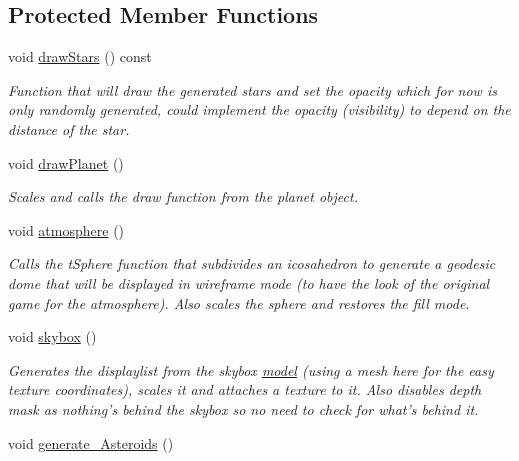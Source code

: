 \subsection*{Protected Member Functions}
\begin{DoxyCompactItemize}
\item 
\hypertarget{classWorld_afe713d51edb875a7b610998fa85d18c3}{
void \hyperlink{classWorld_afe713d51edb875a7b610998fa85d18c3}{drawStars} () const }
\label{classWorld_afe713d51edb875a7b610998fa85d18c3}

\begin{DoxyCompactList}\small\item\em Function that will draw the generated stars and set the opacity which for now is only randomly generated, could implement the opacity (visibility) to depend on the distance of the star. \item\end{DoxyCompactList}\item 
\hypertarget{classWorld_a78116b1eb8f3df6cdb8f0d0c6ee71d0c}{
void \hyperlink{classWorld_a78116b1eb8f3df6cdb8f0d0c6ee71d0c}{drawPlanet} ()}
\label{classWorld_a78116b1eb8f3df6cdb8f0d0c6ee71d0c}

\begin{DoxyCompactList}\small\item\em Scales and calls the draw function from the planet object. \item\end{DoxyCompactList}\item 
\hypertarget{classWorld_acd929be916faa5c4ede7d3bfe35ac3e4}{
void \hyperlink{classWorld_acd929be916faa5c4ede7d3bfe35ac3e4}{atmosphere} ()}
\label{classWorld_acd929be916faa5c4ede7d3bfe35ac3e4}

\begin{DoxyCompactList}\small\item\em Calls the tSphere function that subdivides an icosahedron to generate a geodesic dome that will be displayed in wireframe mode (to have the look of the original game for the atmosphere). Also scales the sphere and restores the fill mode. \item\end{DoxyCompactList}\item 
\hypertarget{classWorld_a94bcffbbf293e01abfbe7c3c9da4dc83}{
void \hyperlink{classWorld_a94bcffbbf293e01abfbe7c3c9da4dc83}{skybox} ()}
\label{classWorld_a94bcffbbf293e01abfbe7c3c9da4dc83}

\begin{DoxyCompactList}\small\item\em Generates the displaylist from the skybox \hyperlink{structmodel}{model} (using a mesh here for the easy texture coordinates), scales it and attaches a texture to it. Also disables depth mask as nothing's behind the skybox so no need to check for what's behind it. \item\end{DoxyCompactList}\item 
\hypertarget{classWorld_a84d83e54fbfa8a696a00b6ed45ba43ca}{
void \hyperlink{classWorld_a84d83e54fbfa8a696a00b6ed45ba43ca}{generate\_\-Asteroids} ()}
\label{classWorld_a84d83e54fbfa8a696a00b6ed45ba43ca}


\end{DoxyCompactItemize}
